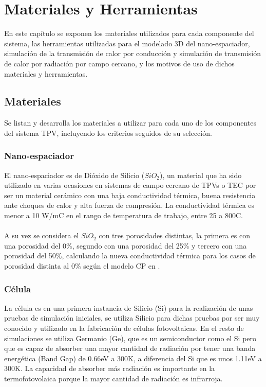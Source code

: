 \chapter{Materiales y Herramientas}
En este capítulo se exponen los materiales utilizados para cada componente del sistema, las herramientas utilizadas para el modelado 3D del nano-espaciador, simulación de la transmisión de calor por conducción y simulación de transmisión de calor por radiación por campo cercano, y los motivos de uso de dichos materiales y herramientas.
\section{Materiales}
Se listan y desarrolla los materiales a utilizar para cada uno de los componentes del sistema TPV, incluyendo los criterios seguidos de su selección.
\subsection{Nano-espaciador}
El nano-espaciador es de Dióxido de Silicio ($SiO_2$), un material que ha sido utilizado en varias ocasiones en sistemas de campo cercano de TPVs o TEC por ser un material cerámico con una baja conductividad térmica, buena resistencia ante choques de calor y alta fuerza de compresión. La conductividad térmica es menor a 10 W/m\textdegree C en el rango de temperatura de trabajo, entre 25 a 800\textdegree C.\\\\
A su vez se considera el $SiO_2$ con tres porosidades distintas, la primera es con una porosidad del 0\%, segundo con una porosidad del 25\% y tercero con una porosidad del 50\%, calculando la nueva conductividad térmica para los casos de porosidad distinta al 0\% según el modelo CP en \cite{ThermalConductivity_SiO2_2018}.

\subsection{Célula}
La célula es en una primera instancia de Silicio (Si) para la realización de unas pruebas de simulación iniciales, se utiliza Silicio para dichas pruebas por ser muy conocido y utilizado en la fabricación de células fotovoltaicas. En el resto de simulaciones se utiliza Germanio (Ge), que es un semiconductor como el Si pero que es capaz de absorber una mayor cantidad de radiación por tener una banda energética (Band Gap) de 0.66eV a 300K, a diferencia del Si que es unos 1.11eV a 300K. La capacidad de absorber más radiación es importante en la termofotovolaica porque la mayor cantidad de radiación es infrarroja.\\

